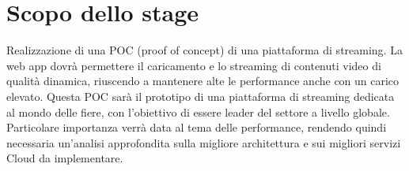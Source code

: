 \section*{Scopo dello stage}
Realizzazione di una POC (proof of concept) di una piattaforma di streaming. La web app dovrà permettere il caricamento e lo streaming di contenuti video di qualità dinamica, riuscendo a mantenere alte le performance anche con un carico elevato.
Questa POC sarà il prototipo di una piattaforma di streaming dedicata al mondo delle fiere, con l'obiettivo di essere leader del settore a livello globale.
Particolare importanza verrà data al tema delle performance, rendendo quindi necessaria un'analisi approfondita sulla migliore architettura e sui migliori servizi Cloud da implementare.




